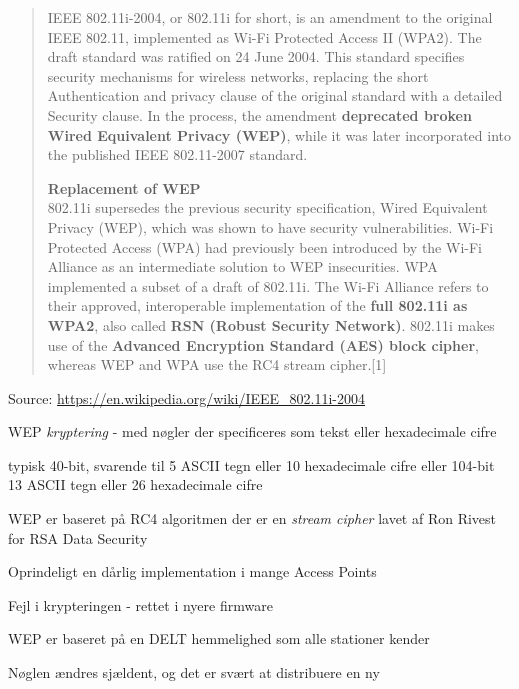 \documentclass[Screen16to9,17pt]{foils}
\begin{document}
\begin{quote}
IEEE 802.11i-2004, or 802.11i for short, is an amendment to the original IEEE 802.11, implemented as Wi-Fi Protected Access II (WPA2). The draft standard was ratified on 24 June 2004. This standard specifies security mechanisms for wireless networks, replacing the short Authentication and privacy clause of the original standard with a detailed Security clause. In the process, the amendment {\bf deprecated broken Wired Equivalent Privacy (WEP)}, while it was later incorporated into the published IEEE 802.11-2007 standard.

{\bf Replacement of WEP}\\
802.11i supersedes the previous security specification, Wired Equivalent Privacy (WEP), which was shown to have security vulnerabilities. Wi-Fi Protected Access (WPA) had previously been introduced by the Wi-Fi Alliance as an intermediate solution to WEP insecurities. WPA implemented a subset of a draft of 802.11i. The Wi-Fi Alliance refers to their approved, interoperable implementation of the {\bf full 802.11i as WPA2}, also called {\bf RSN (Robust Security Network)}. 802.11i makes use of the {\bf Advanced Encryption Standard (AES) block cipher}, whereas WEP and WPA use the RC4 stream cipher.[1]
\end{quote}
Source: \url{https://en.wikipedia.org/wiki/IEEE_802.11i-2004}




\begin{list1}
\item WEP \emph{kryptering} - med nøgler der specificeres som tekst
  eller hexadecimale cifre
\item typisk 40-bit, svarende til 5 ASCII tegn eller 10 hexadecimale
  cifre eller 104-bit 13 ASCII tegn eller 26 hexadecimale cifre
\item WEP er baseret på RC4 algoritmen der er en \emph{stream cipher}
  lavet af Ron Rivest for RSA Data Security
\end{list1}


\begin{list1}
\item Oprindeligt en dårlig implementation i mange Access Points
\item Fejl i krypteringen - rettet i nyere firmware
\item WEP er baseret på en DELT hemmelighed som alle stationer kender
\item Nøglen ændres sjældent, og det er svært at distribuere en ny
\end{list1}
\end{document}
